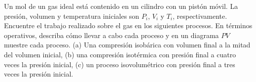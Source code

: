 \item Un mol de un gas ideal está contenido en un cilindro con un pistón móvil. La presión, volumen y temperatura iniciales son $P_i$, $V_i$ y $T_i$, respectivamente. Encuentre el trabajo realizado sobre el gas en los siguientes procesos. En términos operativos, describa cómo llevar a cabo cada proceso y en un diagrama $PV$ muestre cada proceso. (a) Una compresión isobárica con volumen final a la mitad del volumen inicial, (b) una compresión isotérmica con presión final a cuatro veces la presión inicial, (c) un proceso isovolumétrico con presión final a tres veces la presión inicial.
